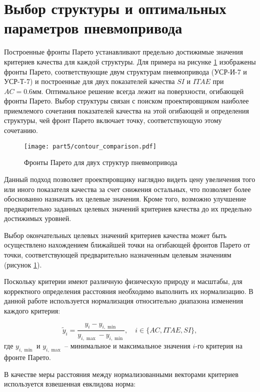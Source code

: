 \section{Выбор структуры и оптимальных параметров пневмопривода}\label{sec:inverse_optimization}

Построенные фронты Парето устанавливают предельно достижимые значения
критериев качества для каждой структуры. Для примера на рисунке \ref{fig:pareto_fronts_two}
изображены фронты Парето, соответствующие двум структурам пневмопривода (УСР-И-7 и УСР-Т-7)
и построенные для двух показателей качества $SI$ и $ITAE$ при $AC = \num{0.6}\text{мм}$. Оптимальное решение
всегда лежит на поверхности, огибающей фронты Парето. Выбор
структуры связан с поиском проектировщиком наиболее приемлемого сочетания
показателей качества на этой огибающей и определения структуры, чей фронт
Парето включает точку, соответствующую этому сочетанию.

\begin{figure}[h]
	\centering
	\texttt{[image: part5/contour\_comparison.pdf]}
	\caption{Фронты Парето для двух структур пневмопривода}
	\label{fig:pareto_fronts_two}
\end{figure}
	

Данный подход позволяет проектировщику наглядно видеть цену
увеличения того или иного показателя качества за счет снижения
остальных, что позволяет более обоснованно назначать их целевые
значения. Кроме того, возможно улучшение предварительно заданных
целевых значений критериев качества до их предельно достижимых уровней.

Выбор окончательных целевых значений критериев качества может
быть осуществлено нахождением ближайшей точки на огибающей фронтов
Парето от точки, соответствующей предварительно назначенным целевым значениям (рисунок \ref{fig:pareto_fronts_two}).

Поскольку критерии имеют различную физическую природу и масштабы, для корректного определения
расстояния необходимо выполнить их нормализацию.
В данной работе используется нормализация относительно диапазона изменения каждого критерия:

\begin{equation}\label{eq:normalization}
	\tilde{y}_i = \frac{y_i - y_{i,\min}}{y_{i,\max} - y_{i,\min}}, \quad i \in \{AC, ITAE, SI\},
\end{equation}
где $y_{i,\min}$ и $y_{i,\max}$ -- минимальное и максимальное значения $i$-го критерия на фронте Парето.

В качестве меры расстояния между нормализованными векторами критериев используется взвешенная евклидова норма:

